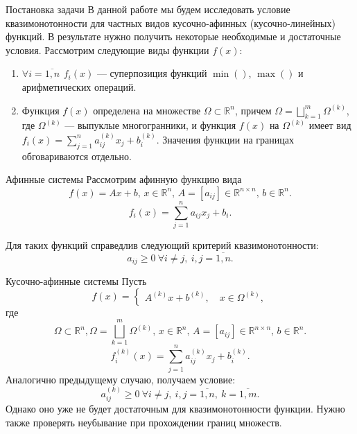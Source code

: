 \documentclass[envcountsect]{beamer}
\theoremstyle{definition}
\begin{document}
	\begin{frame}{Постановка задачи}
		В данной работе мы будем исследовать условие квазимонотонности для частных видов кусочно-афинных (кусочно-линейных) функций. В результате нужно получить некоторые необходимые и достаточные условия. Рассмотрим следующие виды функции \(f(x)\):
		\begin{enumerate}
			\item \(\forall i = \overline{1,n}\ \, f_i(x) \) --- суперпозиция функций \(\min()\), \(\max()\) и арифметических операций.
			\item Функция \(f(x)\) определена на множестве \(\Omega \subset \mathbb{R}^n\), причем \(\Omega = \bigsqcup_{k = 1}^m \Omega^{(k)}\), где \(\Omega^{(k)}\) --- выпуклые многогранники, и функция \(f(x)\) на \(\Omega^{(k)}\) имеет вид \(f_i(x) = \sum_{j = 1}^{n} a_{ij}^{(k)}x_j + b_i^{(k)}\). Значения функции на границах обговариваются отдельно.
		\end{enumerate}
	\end{frame}
	
	\begin{frame}{Афинные системы}
		Рассмотрим афинную функцию вида
		\[f(x) = Ax + b,\, x \in \mathbb{R}^{n},\, A=[a_{ij}] \in \mathbb{R}^{n \times n},\, b \in \mathbb{R}^{n}.\]
		\[f_i(x) = \sum_{j=1}^{n} a_{ij}x_j + b_i.\]
		
		Для таких функций справедлив следующий критерий квазимонотонности:
		\begin{equation} \label{qmaff}
			a_{ij} \ge 0\ \forall i \neq j,\ i,j = \overline{1, n}.
		\end{equation}
	\end{frame}
	
	\begin{frame}{Кусочно-афинные системы}
		Пусть 
		\[f(x) = \begin{cases}A^{(k)}x + b^{(k)},\quad x \in \Omega^{(k)},\end{cases}\]
		где
		\[\Omega \subset \mathbb{R}^n, \Omega = \bigsqcup_{k = 1}^m \Omega^{(k)},\, x \in \mathbb{R}^{n},\, A=[a_{ij}] \in \mathbb{R}^{n \times n},\, b \in \mathbb{R}^{n}.\]
		\[f_i^{(k)}(x) = \sum_{j=1}^{n} a_{ij}^{(k)}x_j + b_i^{(k)}.\]
		Аналогично предыдущему случаю, получаем условие:
		\begin{equation} \label{qmpwaff}
			a_{ij}^{(k)} \ge 0\ \forall i \neq j,\ i,j = \overline{1, n},\ k = \overline{1, m}.
		\end{equation}
		Однако оно уже не будет достаточным для квазимонотонности функции. Нужно также проверять неубывание при прохождении границ множеств.
	\end{frame}
	
\end{document}
